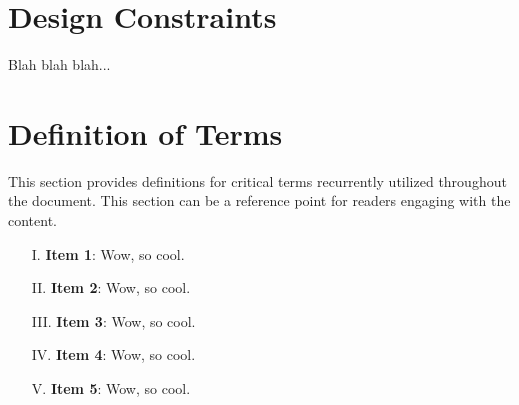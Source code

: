 \documentclass{article}
\begin{document}
\section{Design Constraints}
Blah blah blah...

\section{Definition of Terms}
This section provides definitions for critical terms recurrently utilized throughout the document. This section can be a reference point for readers engaging with the content.

\begin{enumerate}
    \item[I.] \textbf{Item 1}: Wow, so cool.
    \item[II.] \textbf{Item 2}: Wow, so cool.
    \item[III.] \textbf{Item 3}: Wow, so cool.
    \item[IV.] \textbf{Item 4}: Wow, so cool.
    \item[V.] \textbf{Item 5}: Wow, so cool.
\end{enumerate}

\newpage

\printbibliography

{\parindent0pt}
\end{document}
